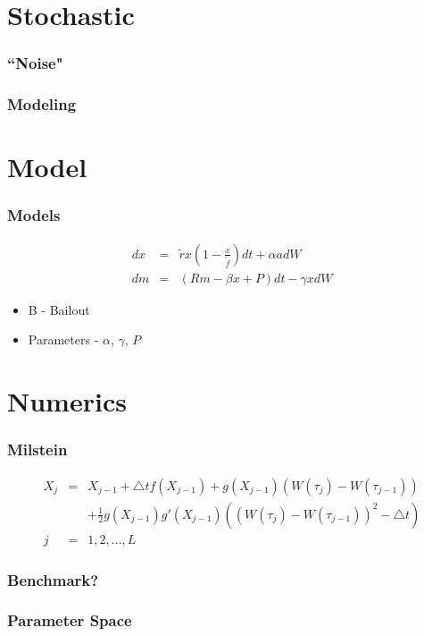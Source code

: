 



\section{Stochastic}

\begin{frame}
    \frametitle{``Noise"}
\end{frame}

\begin{frame}
    \frametitle{Modeling}
\end{frame}






\section{Model}

\begin{frame}
    \frametitle{Models}
	\begin{eqnarray}
		dx &=& \tilde{r} x \left( 1- \frac{x}{\tilde{f}}\right) dt +\alpha a dW \\
		dm &=& (Rm - \beta x + P) dt - \gamma x dW
	\end{eqnarray}
	\begin{itemize}
		\item B - Bailout
		\item Parameters - $\alpha$, $\gamma$, $P$
	\end{itemize}
\end{frame}





\section{Numerics}

\begin{frame}
    \frametitle{Milstein}
	\begin{eqnarray*}
		X_{j} &=& X_{j-1} + \triangle tf(X_{j-1}) + g(X_{j-1})(W(\tau_{j})-W(\tau_{j-1})) 			\nonumber\\ 
		&& + \frac{1}{2} g(X_{j-1})g'(X_{j-1})((W(\tau_{j})-W(\tau_{j-1}))^{2}-\triangle t)
		\\ j &=& 1,2,... ,L
	\end{eqnarray*}

\end{frame}


\begin{frame}
    \frametitle{Benchmark?}
\end{frame}


\begin{frame}
    \frametitle{Parameter Space}
\end{frame}



